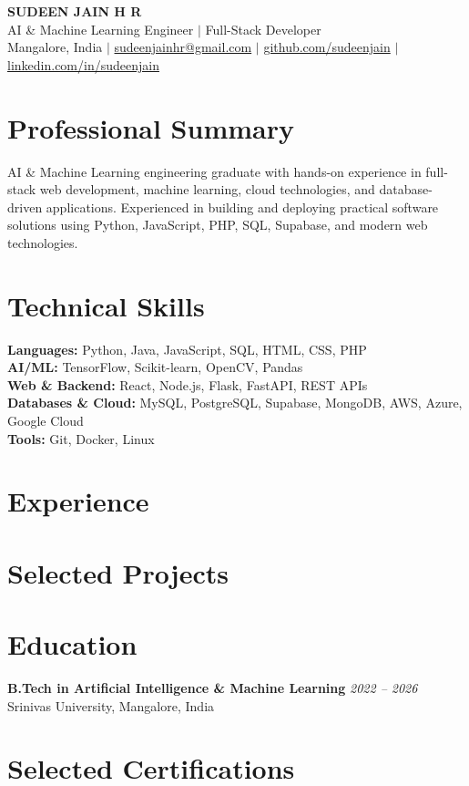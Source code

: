 \documentclass[10pt,letterpaper]{article}
\begin{document}
\begin{center}
  {\LARGE\bfseries SUDEEN JAIN H R}\\[2pt]
  {\normalsize AI \& Machine Learning Engineer $|$ Full-Stack Developer}\\[4pt]
  \small
  Mangalore, India $|$
  \href{mailto:sudeenjainhr@gmail.com}{sudeenjainhr@gmail.com} $|$
  \href{https://github.com/sudeenjain}{github.com/sudeenjain} $|$
  \href{https://linkedin.com/in/sudeenjain}{linkedin.com/in/sudeenjain}
\end{center}

\section{Professional Summary}
AI \& Machine Learning engineering graduate with hands-on experience in full-stack web development, machine learning, cloud technologies, and database-driven applications. Experienced in building and deploying practical software solutions using Python, JavaScript, PHP, SQL, Supabase, and modern web technologies.

\section{Technical Skills}
\textbf{Languages:} Python, Java, JavaScript, SQL, HTML, CSS, PHP\\
\textbf{AI/ML:} TensorFlow, Scikit-learn, OpenCV, Pandas\\
\textbf{Web \& Backend:} React, Node.js, Flask, FastAPI, REST APIs\\
\textbf{Databases \& Cloud:} MySQL, PostgreSQL, Supabase, MongoDB, AWS, Azure, Google Cloud\\
\textbf{Tools:} Git, Docker, Linux

\section{Experience}

\section{Selected Projects}

\section{Education}
\textbf{B.Tech in Artificial Intelligence \& Machine Learning}
\hfill \textit{2022 -- 2026}\\
Srinivas University, Mangalore, India

\section{Selected Certifications}
\end{document}
